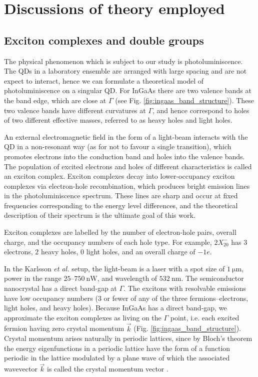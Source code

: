 \section{Discussions of theory employed}

\subsection[Exciton complexes]{Exciton complexes and double groups} \label{sec:exciton_theory}
The physical phenomenon which is subject to our study is photoluminiscence. The QDs in a laboratory ensemble are arranged with large spacing and are not expect to interact, hence we can formulate a theoretical model of photoluminiscence on a singular QD. For InGaAs there are two valence bands at the band edge, which are close at $\Gamma$ (see Fig. \ref{fig:ingaas_band_structure}). These two valence bands have different curvatures at $\Gamma$, and hence correspond to holes of two different effective masses, referred to as heavy holes and light holes.

An external electromagnetic field in the form of a light-beam interacts with the QD in a non-resonant way (as for not to favour a single transition), which promotes electrons into the conduction band and holes into the valence bands. The population of excited electrons and holes of different characteristics is called an exciton complex. Exciton complexes decay into lower-occupancy exciton complexes via electron-hole recombination, which produces bright emission lines in the photoluminiscence spectrum. These lines are sharp and occur at fixed frequencies corresponding to the energy level differences, and the theoretical description of their spectrum is the ultimate goal of this work.

Exciton complexes are labelled by the number of electron-hole pairs, overall charge, and the occupancy numbers of each hole type. For example, $2X^-_{20}$ has $3$ electrons, $2$ heavy holes, $0$ light holes, and an overall charge of $-1e$.

In the Karlsson \textit{et al.} setup, the light-beam is a laser with a spot size of $\SI{1}{\micro\metre}$, power in the range $25$--$\SI{750}{\nano\watt}$, and wavelength of $\SI{532}{\nano\metre}$. The semiconductor nanocrystal has a direct band-gap at $\Gamma$. The excitons with resolvable emissions have low occupancy numbers (3 or fewer of any of the three fermions--electrons, light holes, and heavy holes). Because InGaAs has a direct band-gap, we approximate the exciton complexes as living on the $\Gamma$ point, i.e. each excited fermion having zero crystal momentum $\vec{k}$ (Fig. \ref{fig:ingaas_band_structure}). Crystal momentum arises naturally in periodic lattices, since by Bloch's theorem the energy eigenfunctions in a periodic lattice have the form of a function periodic in the lattice modulated by a plane wave of which the associated wavevector $\vec{k}$ is called the crystal momentum vector \cite[Ch. 2.2]{singh}.

